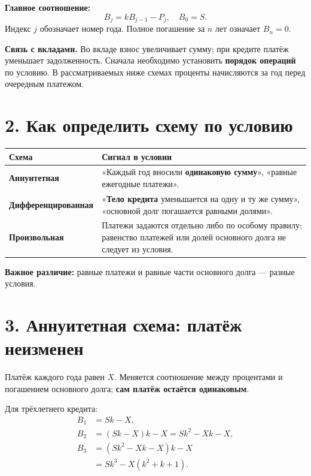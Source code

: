 \documentclass[a4paper,12pt]{article}
\newcommand{\key}[1]{\textcolor{darkaccent}{\textbf{#1}}}
\newcommand{\fboxeq}[1]{\[\boxed{#1}\]}
\begin{document}
\key{Главное соотношение:}
\fboxeq{B_{j}=kB_{j-1}-P_j,\quad B_0=S.}
Индекс $j$ обозначает номер года. Полное погашение за $n$ лет означает $B_n=0$.

\textbf{Связь с вкладами.} Во вкладе взнос увеличивает сумму; при кредите платёж уменьшает задолженность. Сначала необходимо установить \key{порядок операций} по условию. В рассматриваемых ниже схемах проценты начисляются за год перед очередным платежом.

\section*{2. Как определить схему по условию}

\begin{center}
\renewcommand{\arraystretch}{1.35}
\begin{tabularx}{\linewidth}{@{}>{\raggedright\arraybackslash}p{48mm} >{\raggedright\arraybackslash}X@{}}
\toprule
Схема & Сигнал в условии \\
\midrule
\key{Аннуитетная} & «Каждый год вносили \textbf{одинаковую сумму}», «равные ежегодные платежи». \\
\key{Дифференцированная} & «\textbf{Тело кредита} уменьшается на одну и ту же сумму», «основной долг погашается равными долями». \\
\key{Произвольная} & Платежи задаются отдельно либо по особому правилу; равенство платежей или долей основного долга не следует из условия. \\
\bottomrule
\end{tabularx}
\end{center}

\key{Важное различие:} равные платежи и равные части основного долга --- разные условия.

\clearpage
\section*{3. Аннуитетная схема: платёж неизменен}

Платёж каждого года равен $X$. Меняется соотношение между процентами и погашением основного долга; \key{сам платёж остаётся одинаковым}.

Для трёхлетнего кредита:
\[
\begin{aligned}
 B_1&=Sk-X,\\
 B_2&=(Sk-X)k-X=Sk^2-Xk-X,\\
 B_3&=(Sk^2-Xk-X)k-X\\
 &=Sk^3-X(k^2+k+1).
\end{aligned}
\]
\end{document}
